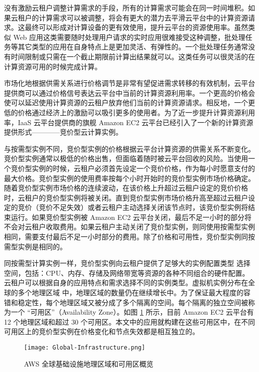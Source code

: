 没有激励云租户调整计算需求的手段，所有的计算需求可能会在同一时间堆积。如果云租户的计算需求可以被调整，将会有更大的潜力去平滑云平台中的计算资源请求。这最终可以形成对计算设备的更有效使用，提升云平台的资源使用率。虽然类似 Web 应用这类需要随时处理用户请求的实时应用很难接受这种调整，批处理任务等其它类型的应用在自身特点上是更加灵活、有弹性的。一个批处理任务通常没有时间限制或只需在一个截止期限前计算出结果就可以。这类任务可以很灵活的在计算资源可用的时候完成计算。

市场化地根据供需关系进行价格调节是非常有望促进需求转移的有效机制，云平台提供商可以通过价格信号表达云平台中当前的计算资源利用率。一个更高的价格会使可以延迟使用计算资源的云租户放弃他们当前的计算资源请求。相反地，一个更低的价格通过经济上的激励可以吸引更多的使用者。为了近一步提升计算资源利用率，IaaS 云平台提供商的旗舰 Amazon EC2 云平台已经引入了一个新的计算资源提供形式————竞价型云计算实例。

与按需型实例不同，竞价型实例的价格根据云平台计算资源的供需关系不断变化。竞价型实例通常以极低的价格出售，但面临着随时被云平台回收的风险。当使用一个竞价型实例的时候，云租户必须首先设定一个竞价价格，作为每小时愿意支付的最大价格。竞价型实例的使用费率按每个小时开始时的竞价型实例市场价格确定。随着竞价型实例市场价格的连续波动，在该价格上升超过云租户设定的竞价价格时，云租户的竞价型实例将被关闭。直到竞价型实例市场价格升高至超过云租户设定的竞价（竞价不足失效）或者云租户主动选择关闭该节点时，该竞价型实例将结束运行。如果竞价型实例被 Amazon EC2 云平台关闭，最后不足一小时的部分将不会对云租户收取费用。如果云租户主动关闭了竞价型实例，则同使用按需型实例相同，需要支付最后不足一小时部分的费用。除了价格和可用性，竞价型实例同按需型实例是相同的。

同按需型计算实例一样，竞价型实例向云租户提供了足够大的实例配置类型 \cite{AWS_IT:2014} 选择空间，包括：CPU、内存、存储及网络带宽等资源的各种不同组合的硬件配置。云租户可以根据自身的应用特点和需求选择不同的实例类型。虚拟机实例分布在全球的多个地理区域 \cite{AWS_GI:2014} 中，地理区域的数量仍在继续增长中。为了保证最大程度的容错和稳定性，每个地理区域又被分成了多个隔离的空间。每个隔离的独立空间被称为一个 ``可用区''（Availability Zone）。如图 \ref{figure:aws-gi} 所示，目前 Amazon EC2 云平台有 12 个地理区域和超过 30 个可用区。本文中的应用就构建在这些可用区中，在不同可用区上的竞价型实例在价格变化和节点失效都是相互独立的。
\begin{figure}
  \centering
  \texttt{[image: Global-Infrastructure.png]}
  \caption{AWS 全球基础设施地理区域和可用区概览 \cite{AWS_GI:2014}}
  \label{figure:aws-gi}
\end{figure}

